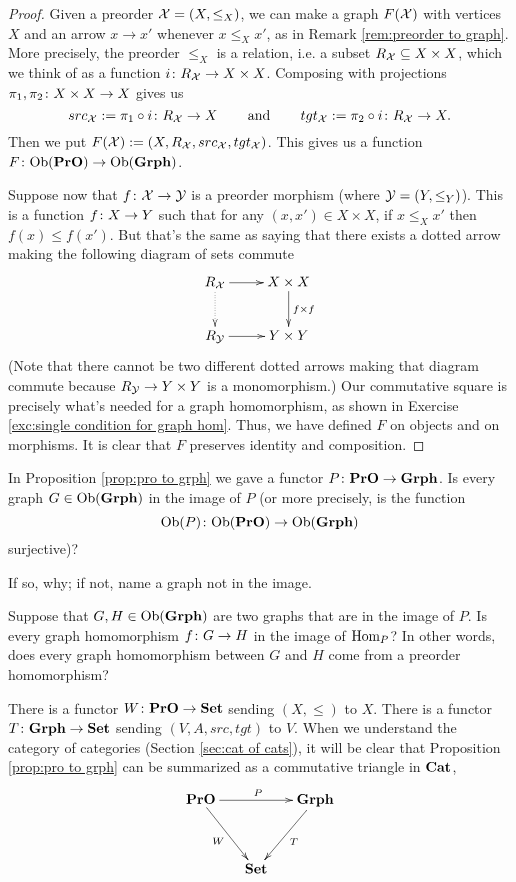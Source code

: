 \documentclass[CT4S-EN-RU]{subfiles}
\begin{document}
\begin{proof}

Given a preorder $\mathcal{X}=(X,\leq_X)$, we can make a graph $F(\mathcal{X})$ with vertices $X$ and an arrow $x\to x'$ whenever $x\leq_X x'$, as in Remark \ref{rem:preorder to graph}. More precisely, the preorder $\leq_X$ is a relation, i.e. a subset $R_\mathcal{X}\subseteq X\times X$, which we think of as a function $i\colon R_\mathcal{X}\rightarrow X\times X$. Composing with projections $\pi_1,\pi_2\colon X\times X\rightarrow X$ gives us $$src_\mathcal{X}:=\pi_1\circ i\colon R_\mathcal{X}\rightarrow X\hspace{.3in}\textnormal{and}\hspace{.3in} tgt_\mathcal{X}:=\pi_2\circ i\colon R_\mathcal{X}\rightarrow X.$$ Then we put $F(\mathcal{X}):=(X,R_\mathcal{X},src_\mathcal{X},tgt_\mathcal{X})$. This gives us a function $F\colon\textnormal{Ob}({\bf PrO})\rightarrow\textnormal{Ob}({\bf Grph})$.

Suppose now that $f\colon\mathcal{X}\rightarrow\mathcal{Y}$ is a preorder morphism (where $\mathcal{Y}=(Y,\leq_Y)$). This is a function $f\colon X\rightarrow Y$ such that for any $(x,x')\in X\times X$, if $x\leq_X x'$ then $f(x)\leq f(x')$. But that's the same as saying that there exists a dotted arrow making the following diagram of sets commute
$$
\xymatrix{R_\mcX\ar[r]\ar@{..>}[d]&X\times X\ar[d]^{f\times f}\\R_\mcY\ar[r]&Y\times Y
}
$$
(Note that there cannot be two different dotted arrows making that diagram commute because $R_\mathcal{Y}\rightarrow Y\times Y$ is a monomorphism.) 
Our commutative square is precisely what's needed for a graph homomorphism, as shown in Exercise \ref{exc:single condition for graph hom}. Thus, we have defined $F$ on objects and on morphisms. It is clear that $F$ preserves identity and composition.

\end{proof}

\begin{exercise}
In Proposition \ref{prop:pro to grph} we gave a functor $P\colon{\bf PrO}\rightarrow{\bf Grph}$.
\sexc  Is every graph $G\in\textnormal{Ob}({\bf Grph})$ in the image of $P$ (or more precisely, is the function $$\textnormal{Ob}(P)\colon\textnormal{Ob}({\bf PrO})\rightarrow\textnormal{Ob}({\bf Grph})$$ surjective)?
\item If so, why; if not, name a graph not in the image.
\item Suppose that $G, H\in\textnormal{Ob}({\bf Grph})$ are two graphs that are in the image of $P$. Is every graph homomorphism $f\colon G\rightarrow H$ in the image of $\textnormal{Hom}_P$? In other words, does every graph homomorphism between $G$ and $H$ come from a preorder homomorphism?
\endsexc
\end{exercise}

\begin{remark}

There is a functor $W\colon{\bf PrO}\rightarrow{\bf Set}$ sending $(X,\leq)$ to $X$. There is a functor $T\colon{\bf Grph}\rightarrow{\bf Set}$ sending $(V,A,src,tgt)$ to $V$. When we understand the category of categories (Section \ref{sec:cat of cats}), it will be clear that Proposition \ref{prop:pro to grph} can be summarized as a commutative triangle in ${\bf Cat}$, 
$$
\xymatrix@=15pt{\PrO\ar[rr]^P\ar[ddr]_W&&\Grph\ar[ddl]^T\\\\&\Set}
$$

\end{remark}
\end{document}
